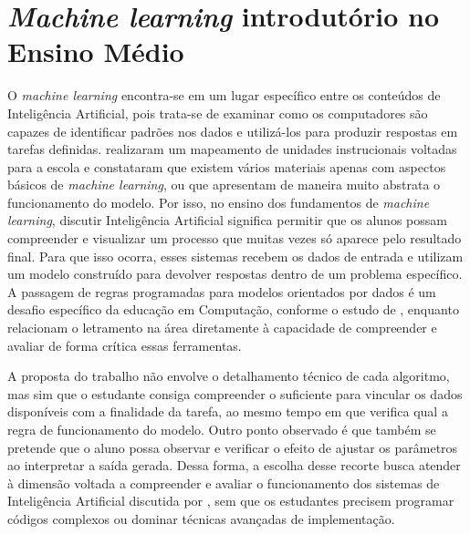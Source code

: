 \section{\textit{Machine learning} introdutório no Ensino Médio}

O \textit{machine learning} encontra-se em um lugar específico entre os conteúdos de Inteligência Artificial, pois trata-se de examinar como os computadores são capazes de identificar padrões nos dados e utilizá-los para produzir respostas em tarefas definidas.  realizaram um mapeamento de unidades instrucionais voltadas para a escola e constataram que existem vários materiais apenas com aspectos básicos de \textit{machine learning}, ou que apresentam de maneira muito abstrata o funcionamento do modelo. Por isso, no ensino dos fundamentos de \textit{machine learning}, discutir Inteligência Artificial significa permitir que os alunos possam compreender e visualizar um processo que muitas vezes só aparece pelo resultado final. Para que isso ocorra, esses sistemas recebem os dados de entrada e utilizam um modelo construído para devolver respostas dentro de um problema específico. A passagem de regras programadas para modelos orientados por dados é um desafio específico da educação em Computação, conforme o estudo de , enquanto  relacionam o letramento na área diretamente à capacidade de compreender e avaliar de forma crítica essas ferramentas.

A proposta do trabalho não envolve o detalhamento técnico de cada algoritmo, mas sim que o estudante consiga compreender o suficiente para vincular os dados disponíveis com a finalidade da tarefa, ao mesmo tempo em que verifica qual a regra de funcionamento do modelo. Outro ponto observado é que também se pretende que o aluno possa observar e verificar o efeito de ajustar os parâmetros ao interpretar a saída gerada. Dessa forma, a escolha desse recorte busca atender à dimensão voltada a compreender e avaliar o funcionamento dos sistemas de Inteligência Artificial discutida por , sem que os estudantes precisem programar códigos complexos ou dominar técnicas avançadas de implementação.

